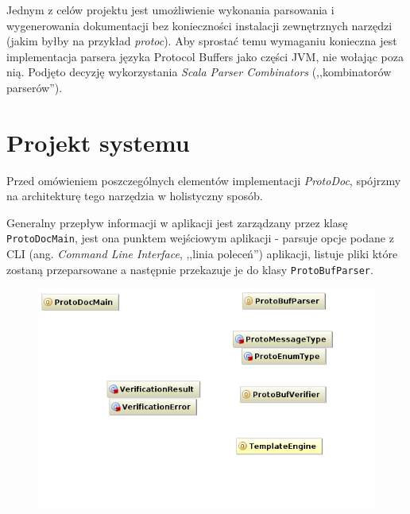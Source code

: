 \documentclass[pdflatex,11pt]{aghdpl}
\begin{document}
Jednym z celów projektu jest umożliwienie wykonania parsowania i wygenerowania dokumentacji bez konieczności
instalacji zewnętrznych narzędzi (jakim byłby na przykład \textit{protoc}). Aby sprostać temu wymaganiu konieczna jest implementacja parsera 
języka Protocol Buffers jako części JVM, nie wołając poza nią. Podjęto decyzję wykorzystania \textit{Scala Parser Combinators} (,,kombinatorów parserów'').


\newpage
\section{Projekt systemu}
\label{sec:projekt_systemu}

Przed omówieniem poszczególnych elementów implementacji \textit{ProtoDoc}, 
spójrzmy na architekturę tego narzędzia w holistyczny sposób.


Generalny przepływ informacji w aplikacji jest zarządzany przez klasę \verb|ProtoDocMain|,
jest ona punktem wejściowym aplikacji - parsuje opcje podane z CLI (ang. \textit{Command Line Interface}, ,,linia poleceń'') aplikacji,
listuje pliki które zostaną przeparsowane a następnie przekazuje je do klasy \verb|ProtoBufParser|.

\begin{figure}[ch]
\begin{center}
 \includegraphics[scale=0.7]{main_classes.png}
\end{center}
\end{figure}
\end{document}
